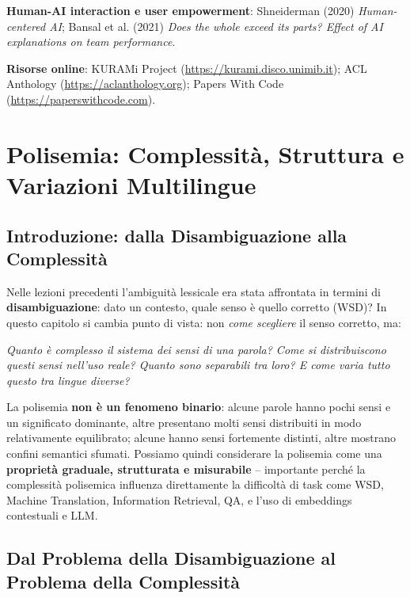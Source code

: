 \documentclass[12pt,a4paper]{article}
\begin{document}
\textbf{Human-AI interaction e user empowerment}: Shneiderman (2020) \emph{Human-centered AI}; Bansal et al. (2021) \emph{Does the whole exceed its parts? Effect of AI explanations on team performance}.

\textbf{Risorse online}: KURAMi Project (\url{https://kurami.disco.unimib.it}); ACL Anthology (\url{https://aclanthology.org}); Papers With Code (\url{https://paperswithcode.com}).

\section{Polisemia: Complessit\`a, Struttura e Variazioni Multilingue}

\subsection{Introduzione: dalla Disambiguazione alla Complessit\`a}

Nelle lezioni precedenti l'ambiguit\`a lessicale era stata affrontata in termini di \textbf{disambiguazione}: dato un contesto, quale senso \`e quello corretto (WSD)? In questo capitolo si cambia punto di vista: non \emph{come scegliere} il senso corretto, ma:

\begin{quizbox}
\emph{Quanto \`e complesso il sistema dei sensi di una parola? Come si distribuiscono questi sensi nell'uso reale? Quanto sono separabili tra loro? E come varia tutto questo tra lingue diverse?}
\end{quizbox}

La polisemia \textbf{non \`e un fenomeno binario}: alcune parole hanno pochi sensi e un significato dominante, altre presentano molti sensi distribuiti in modo relativamente equilibrato; alcune hanno sensi fortemente distinti, altre mostrano confini semantici sfumati. Possiamo quindi considerare la polisemia come una \textbf{propriet\`a graduale, strutturata e misurabile} -- importante perch\'e la complessit\`a polisemica influenza direttamente la difficolt\`a di task come WSD, Machine Translation, Information Retrieval, QA, e l'uso di embeddings contestuali e LLM.

\subsection{Dal Problema della Disambiguazione al Problema della Complessit\`a}
\end{document}

